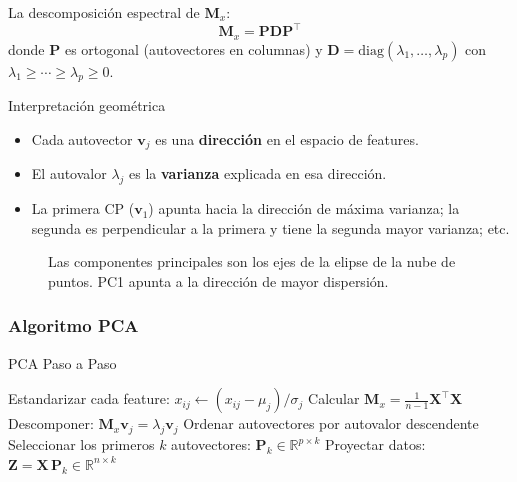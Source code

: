 \documentclass[12pt, a4paper]{article}
\newcommand{\R}{\mathbb{R}}
\begin{document}
La descomposición espectral de $\mathbf{M}_x$:
\[
	\mathbf{M}_x = \mathbf{P}\mathbf{D}\mathbf{P}^\top
\]
donde $\mathbf{P}$ es ortogonal (autovectores en columnas) y
$\mathbf{D} = \text{diag}(\lambda_1, \ldots, \lambda_p)$ con $\lambda_1 \geq \cdots \geq \lambda_p \geq 0$.

\begin{defbox}{Interpretación geométrica}
	\begin{itemize}
		\item Cada autovector $\mathbf{v}_j$ es una \textbf{dirección} en el espacio de features.
		\item El autovalor $\lambda_j$ es la \textbf{varianza} explicada en esa dirección.
		\item La primera CP ($\mathbf{v}_1$) apunta hacia la dirección de máxima varianza;
		      la segunda es perpendicular a la primera y tiene la segunda mayor varianza; etc.
	\end{itemize}
\end{defbox}

\begin{figure}[H]
	\centering
	\caption{Las componentes principales son los ejes de la elipse de la nube de puntos.
		PC1 apunta a la dirección de mayor dispersión.}
\end{figure}

\subsubsection{Algoritmo PCA}

\begin{algbox}{PCA Paso a Paso}
	\begin{algorithmic}[1]
		\State Estandarizar cada feature: $x_{ij} \leftarrow (x_{ij} - \mu_j)/\sigma_j$
		\State Calcular $\mathbf{M}_x = \frac{1}{n-1}\mathbf{X}^\top\mathbf{X}$
		\State Descomponer: $\mathbf{M}_x \mathbf{v}_j = \lambda_j \mathbf{v}_j$
		\State Ordenar autovectores por autovalor descendente
		\State Seleccionar los primeros $k$ autovectores: $\mathbf{P}_k \in \R^{p\times k}$
		\State Proyectar datos: $\mathbf{Z} = \mathbf{X}\,\mathbf{P}_k \in \R^{n\times k}$
	\end{algorithmic}
\end{algbox}
\end{document}
